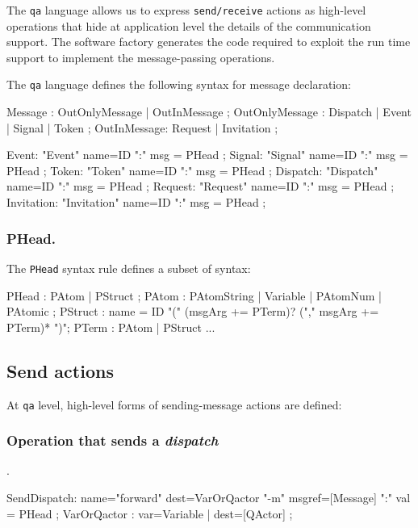 The \texttt{qa} language allows us to express \texttt{send/receive} actions as high-level operations that hide at application level the details of the communication support. The \qa{} software factory generates the code required to exploit the \qa{} run time support to implement the message-passing operations. 

The \texttt{qa} language defines the following syntax for message declaration: 

\begin{javacode}
Message :     	    OutOnlyMessage | OutInMessage  ;
OutOnlyMessage : 	Dispatch |  Event | Signal | Token ; 
OutInMessage: 		Request  | Invitation ;

Event: 		"Event"      name=ID  ":" msg = PHead  ;
Signal: 	"Signal"     name=ID  ":" msg = PHead  ;
Token:		"Token"      name=ID  ":" msg = PHead  ;
Dispatch: 	"Dispatch"   name=ID  ":" msg = PHead  ;
Request: 	"Request"    name=ID  ":" msg = PHead  ;
Invitation:	"Invitation" name=ID  ":" msg = PHead  ;
\end{javacode}
 
\subsubsection{PHead. }The  \texttt{PHead}  syntax rule defines a subset of \prolog{}  syntax:

\begin{javacode}
	PHead : PAtom | PStruct ;
	PAtom : PAtomString | Variable | PAtomNum | PAtomic  ;
	PStruct : name = ID "(" (msgArg += PTerm)? ("," msgArg += PTerm)* ")"; 
	PTerm   : PAtom | PStruct ...
\end{javacode}
 
\subsection{Send actions}
At \texttt{qa} level, high-level forms of sending-message actions are defined:

\subsubsection{Operation that sends a \textit{dispatch}}.
\medskip 
\begin{javacode}
SendDispatch: name="forward" dest=VarOrQactor "-m" msgref=[Message] ":" val = PHead ;
VarOrQactor : var=Variable  | dest=[QActor] ;
\end{javacode}

